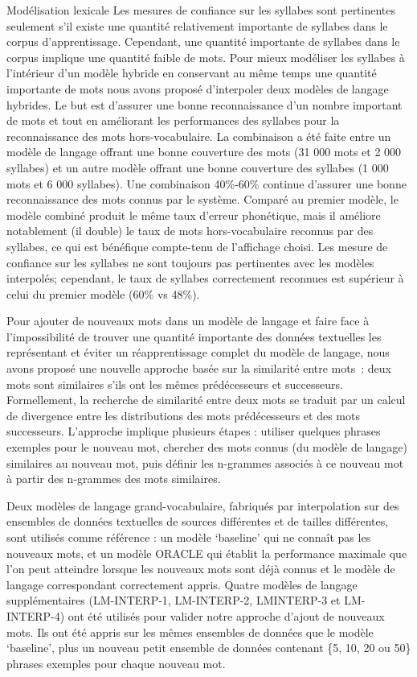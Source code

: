 \documentclass{style/these}
\begin{document}
\begin{part}{Modélisation lexicale}
Les mesures de confiance sur les syllabes sont pertinentes seulement s'il existe une quantité relativement importante de syllabes dans le corpus d'apprentissage. 
Cependant, une quantité importante de syllabes dans le corpus implique une quantité faible de mots. 
Pour mieux modéliser les syllabes à l'intérieur d'un modèle hybride en conservant au même temps une quantité importante de mots nous avons proposé d'interpoler deux modèles de langage hybrides.
Le but est d'assurer une bonne reconnaissance d'un nombre important de mots et tout en améliorant les performances des syllabes pour la reconnaissance des mots hors-vocabulaire. 
La combinaison a été faite entre un modèle de langage offrant une bonne couverture des mots (31 000 mots et 2 000 syllabes) et un autre modèle offrant une bonne couverture des syllabes (1 000 mots et 6 000 syllabes). 
Une combinaison 40\%-60\% continue d'assurer une bonne reconnaissance des mots connus par le système. Comparé au premier modèle, le modèle combiné produit le même taux d'erreur phonétique, mais il améliore notablement (il double) le taux de mots hors-vocabulaire reconnus par des syllabes, ce qui est bénéfique compte-tenu de l'affichage choisi. 
Les mesure de confiance sur les syllabes ne sont toujours pas pertinentes avec les modèles interpolés; cependant, le taux de syllabes correctement reconnues est supérieur à celui du premier modèle (60\% vs 48\%).

Pour ajouter de nouveaux mots dans un modèle de langage et faire face à l'impossibilité de trouver une quantité importante des données textuelles les représentant et éviter un réapprentissage complet du modèle de langage, nous avons proposé une nouvelle approche basée sur la similarité entre mots~: deux mots sont similaires s'ils ont les mêmes prédécesseurs et successeurs.  
Formellement, la recherche de similarité entre deux mots se traduit par un calcul de divergence entre les distributions des mots prédécesseurs et des mots successeurs. 
L'approche implique plusieurs étapes : utiliser quelques phrases exemples pour le nouveau mot, chercher des mots connus (du modèle de langage) similaires au nouveau mot, puis définir les n-grammes associés à ce nouveau mot à partir des n-grammes des mots similaires. 

Deux modèles de langage grand-vocabulaire, fabriqués par interpolation sur des ensembles de données textuelles de sources différentes et de tailles différentes, sont utilisés comme référence : un modèle `baseline' qui ne connaît pas les nouveaux mots, et un modèle ORACLE qui établit la performance maximale que l'on peut atteindre lorsque les nouveaux mots sont déjà connus et le modèle de langage correspondant correctement appris. 
Quatre modèles de langage supplémentaires (LM-INTERP-1, LM-INTERP-2, LMINTERP-3 et LM-INTERP-4) ont été utilisés pour valider notre approche d'ajout de nouveaux mots. 
Ils ont été appris sur les mêmes ensembles de données que le modèle `baseline', plus un nouveau petit ensemble de données contenant \{5, 10, 20 ou 50\} phrases exemples pour chaque nouveau mot.


\end{part}
\end{document}
